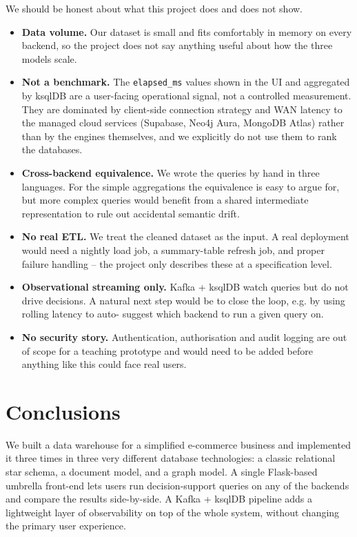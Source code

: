\documentclass[11pt,a4paper]{article}
\begin{document}
We should be honest about what this project does and does not show.

\begin{itemize}[leftmargin=*]
    \item \textbf{Data volume.} Our dataset is small and fits comfortably
          in memory on every backend, so the project does not say
          anything useful about how the three models scale.
    \item \textbf{Not a benchmark.} The \texttt{elapsed\_ms} values shown
          in the UI and aggregated by ksqlDB are a user-facing
          operational signal, not a controlled measurement. They are
          dominated by client-side connection strategy and WAN latency
          to the managed cloud services (Supabase, Neo4j Aura, MongoDB
          Atlas) rather than by the engines themselves, and we
          explicitly do not use them to rank the databases.
    \item \textbf{Cross-backend equivalence.} We wrote the queries by
          hand in three languages. For the simple aggregations the
          equivalence is easy to argue for, but more complex queries
          would benefit from a shared intermediate representation to
          rule out accidental semantic drift.
    \item \textbf{No real ETL.} We treat the cleaned dataset as the
          input. A real deployment would need a nightly load job, a
          summary-table refresh job, and proper failure handling -- the
          project only describes these at a specification level.
    \item \textbf{Observational streaming only.} Kafka + ksqlDB watch
          queries but do not drive decisions. A natural next step would
          be to close the loop, e.g. by using rolling latency to auto-
          suggest which backend to run a given query on.
    \item \textbf{No security story.} Authentication, authorisation and
          audit logging are out of scope for a teaching prototype and
          would need to be added before anything like this could face
          real users.
\end{itemize}

\section{Conclusions}\label{sec:conclusion}

We built a data warehouse for a simplified e-commerce business and
implemented it three times in three very different database technologies: a
classic relational star schema, a document model, and a graph model. A
single Flask-based umbrella front-end lets users run decision-support
queries on any of the backends and compare the results side-by-side. A
Kafka + ksqlDB pipeline adds a lightweight layer of observability on top of
the whole system, without changing the primary user experience.
\end{document}
